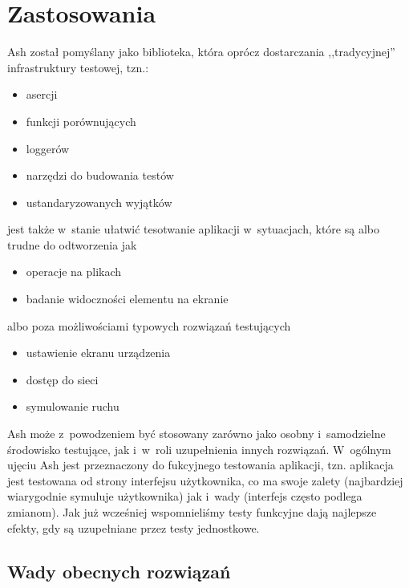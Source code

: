 \documentclass[brudnopis]{xmgr}
\begin{document}
\chapter{Zastosowania}
Ash został pomyślany jako biblioteka, która oprócz dostarczania ,,tradycyjnej'' infrastruktury testowej, tzn.:
\begin{itemize}
  \item asercji
  \item funkcji porównujących
  \item loggerów
  \item narzędzi do budowania testów
  \item ustandaryzowanych wyjątków
\end{itemize}
jest także w~stanie ułatwić tesotwanie aplikacji w~sytuacjach, które są albo trudne do odtworzenia jak
\begin{itemize}
  \item operacje na plikach
  \item badanie widoczności elementu na ekranie
\end{itemize}
 albo poza możliwościami typowych rozwiązań testujących
\begin{itemize}
  \item ustawienie ekranu urządzenia
  \item dostęp do sieci
  \item symulowanie ruchu
\end{itemize}

Ash może z~powodzeniem być stosowany zarówno jako osobny i~samodzielne środowisko testujące, jak i~w~roli uzupełnienia innych rozwiązań. W~ogólnym ujęciu Ash jest przeznaczony do fukcyjnego testowania aplikacji, tzn. aplikacja jest testowana od strony interfejsu użytkownika, co ma swoje zalety (najbardziej wiarygodnie symuluje użytkownika) jak i~wady (interfejs często podlega zmianom). Jak już wcześniej wspomnieliśmy testy funkcyjne dają najlepsze efekty, gdy są uzupełniane przez testy jednostkowe.  

\section{Wady obecnych rozwiązań}
\end{document}
